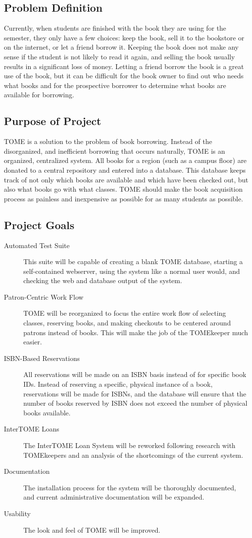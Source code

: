 \documentclass[12pt,titlepage]{article}
\begin{document}
\subsection{Problem Definition}
Currently, when students are finished with the book they are using for the semester, they only have a few choices: keep the book, sell it to the bookstore or on the internet, or let a friend borrow it.  Keeping the book does not make any sense if the student is not likely to read it again, and selling the book usually results in a significant loss of money.  Letting a friend borrow the book is a great use of the book, but it can be difficult for the book owner to find out who needs what books and for the prospective borrower to determine what books are available for borrowing.
\subsection{Purpose of Project}
TOME is a solution to the problem of book borrowing.  Instead of the disorganized, and inefficient borrowing that occurs naturally, TOME is an organized, centralized system.  All books for a region (such as a campus floor) are donated to a central repository and entered into a database.  This database keeps track of not only which books are available and which have been checked out, but also what books go with what classes.  TOME should make the book acquisition process as painless and inexpensive as possible for as many students as possible.
\subsection{Project Goals}
\begin{description}
	\item[Automated Test Suite] This suite will be capable of creating a blank TOME database, starting a self-contained webserver, using the system like a normal user would, and checking the web and database output of the system.
	\item[Patron-Centric Work Flow] TOME will be reorganized to focus the entire work flow of selecting classes, reserving books, and making checkouts to be centered around patrons instead of books.  This will make the job of the TOMEkeeper much easier.
	\item[ISBN-Based Reservations] All reservations will be made on an ISBN basis instead of for specific book IDs.  Instead of reserving a specific, physical instance of a book, reservations will be made for ISBNs, and the database will ensure that the number of books reserved by ISBN does not exceed the number of physical books available.
	\item[InterTOME Loans] The InterTOME Loan System will be reworked following research with TOMEkeepers and an analysis of the shortcomings of the current system.
	\item[Documentation] The installation process for the system will be thoroughly documented, and current administrative documentation will be expanded.
	\item[Usability] The look and feel of TOME will be improved.
\end{description}
\end{document}
